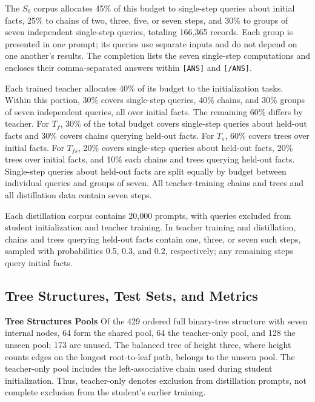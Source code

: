 \documentclass[]{template}
\theoremstyle{plain}
\theoremstyle{definition}
\theoremstyle{remark}
\renewcommand{\paragraph}[1]{\vspace{1mm}\noindent\textbf{#1}}
\begin{document}
The $S_0$ corpus allocates 45\% of this budget to single-step queries about initial facts, 25\% to chains of two, three, five, or seven steps, and 30\% to groups of seven independent single-step queries, totaling 166,365 records. Each group is presented in one prompt; its queries use separate inputs and do not depend on one another's results. The completion lists the seven single-step computations and encloses their comma-separated answers within \texttt{[ANS]} and \texttt{[/ANS]}.

Each trained teacher allocates 40\% of its budget to the initialization tasks. Within this portion, 30\% covers single-step queries, 40\% chains, and 30\% groups of seven independent queries, all over initial facts. The remaining 60\% differs by teacher. For $T_f$, 30\% of the total budget covers single-step queries about held-out facts and 30\% covers chains querying held-out facts. For $T_s$, 60\% covers trees over initial facts. For $T_{fs}$, 20\% covers single-step queries about held-out facts, 20\% trees over initial facts, and 10\% each chains and trees querying held-out facts. Single-step queries about held-out facts are split equally by budget between individual queries and groups of seven. All teacher-training chains and trees and all distillation data contain seven steps.

Each distillation corpus contains 20,000 prompts, with queries excluded from student initialization and teacher training. In teacher training and distillation, chains and trees querying held-out facts contain one, three, or seven such steps, sampled with probabilities 0.5, 0.3, and 0.2, respectively; any remaining steps query initial facts.

\subsection{Tree Structures, Test Sets, and Metrics}
\label{sec:tests_metrics}

\paragraph{Tree Structures Pools}
\label{sec:shape_splits}
Of the 429 ordered full binary-tree structure with seven internal nodes, 64 form the shared pool, 64 the teacher-only pool, and 128 the unseen pool; 173 are unused. The balanced tree of height three, where height counts edges on the longest root-to-leaf path, belongs to the unseen pool. The teacher-only pool includes the left-associative chain used during student initialization. Thus, teacher-only denotes exclusion from distillation prompts, not complete exclusion from the student's earlier training.
\end{document}
